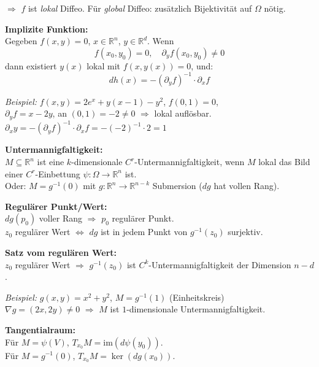 $\Rightarrow$ $f$ ist \textit{lokal} Diffeo. Für \textit{global} Diffeo: zusätzlich Bijektivität auf $\Omega$ nötig.

\textbf{Implizite Funktion:} \\
Gegeben $f(x, y) = 0$, $x \in \mathbb{R}^n$, $y \in \mathbb{R}^d$. Wenn
\[
f(x_0, y_0) = 0, \quad \partial_y f(x_0, y_0) \neq 0
\]
dann existiert $y(x)$ lokal mit $f(x, y(x)) = 0$, und:
\[
dh(x) = -(\partial_y f)^{-1} \cdot \partial_x f
\]

\textit{Beispiel:} $f(x,y) = 2e^x + y(x - 1) - y^2$, $f(0,1) = 0$,\\
$\partial_y f = x - 2y$, an $(0,1) = -2 \neq 0$ $\Rightarrow$ lokal auflösbar.\\
$\partial_x y = -(\partial_y f)^{-1} \cdot \partial_x f = -(-2)^{-1} \cdot 2 = 1$

\vspace{1em}

\textbf{Untermannigfaltigkeit:} \\
$M \subseteq \mathbb{R}^n$ ist eine $k$-dimensionale $C^r$-Untermannigfaltigkeit, wenn $M$ lokal das Bild einer $C^r$-Einbettung $\psi: \Omega \to \mathbb{R}^n$ ist.\\
Oder: $M = g^{-1}(0)$ mit $g: \mathbb{R}^n \to \mathbb{R}^{n-k}$ Submersion ($dg$ hat vollen Rang).

\vspace{1em}

\textbf{Regulärer Punkt/Wert:} \\
$dg(p_0)$ voller Rang $\Rightarrow$ $p_0$ regulärer Punkt.\\
$z_0$ regulärer Wert $\Leftrightarrow$ $dg$ ist in jedem Punkt von $g^{-1}(z_0)$ surjektiv.

\vspace{0.5em}

\textbf{Satz vom regulären Wert:} \\
$z_0$ regulärer Wert $\Rightarrow$ $g^{-1}(z_0)$ ist $C^k$-Untermannigfaltigkeit der Dimension $n - d$.

\vspace{0.5em}

\textit{Beispiel:} $g(x,y) = x^2 + y^2$, $M = g^{-1}(1)$ (Einheitskreis)\\
$\nabla g = (2x, 2y) \neq 0$ $\Rightarrow$ $M$ ist $1$-dimensionale Untermannigfaltigkeit.

\vspace{1em}

\textbf{Tangentialraum:} \\
Für $M = \psi(V)$, $T_{x_0}M = \text{im}(d\psi(y_0))$.\\
Für $M = g^{-1}(0)$, $T_{x_0}M = \ker(dg(x_0))$.

